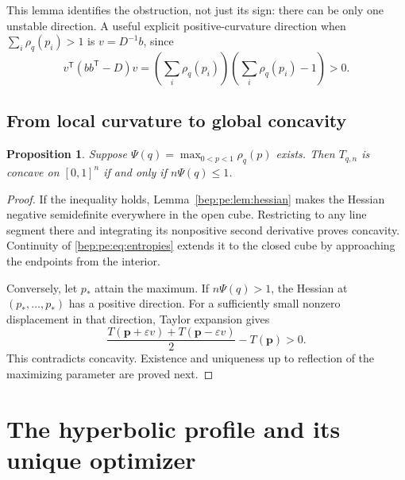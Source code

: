 \documentclass[11pt]{article}
\numberwithin{equation}{section}
\newtheorem{proposition}[theorem]{Proposition}
\theoremstyle{definition}
\theoremstyle{remark}
\newcommand{\p}{\boldsymbol p}
\begin{document}
This lemma identifies the obstruction, not just its sign: there can be
only one unstable direction. A useful explicit positive-curvature
direction when $\sum_i\rho_q(p_i)>1$ is $v=D^{-1}b$, since
\begin{equation}
 v^{\mathsf T}(bb^{\mathsf T}-D)v
 =\left(\sum_i\rho_q(p_i)\right)
  \left(\sum_i\rho_q(p_i)-1\right)>0.
\end{equation}

\subsection{From local curvature to global concavity}
\begin{proposition}\label{bep:pe:prop:criterion}
Suppose $\Psi(q)=\max_{0<p<1}\rho_q(p)$ exists. Then $T_{q,n}$ is
concave on $[0,1]^n$ if and only if $n\Psi(q)\leq1$.
\end{proposition}
\begin{proof}
If the inequality holds, Lemma~\ref{bep:pe:lem:hessian} makes the Hessian
negative semidefinite everywhere in the open cube. Restricting to any
line segment there and integrating its nonpositive second derivative
proves concavity. Continuity of \eqref{bep:pe:eq:entropies} extends it to the
closed cube by approaching the endpoints from the interior.

Conversely, let $p_*$ attain the maximum. If $n\Psi(q)>1$, the
Hessian at $(p_*,\ldots,p_*)$ has a positive direction. For a sufficiently
small nonzero displacement in that direction, Taylor expansion gives
\[
 \frac{T(\p+\varepsilon v)+T(\p-\varepsilon v)}2-T(\p)>0.
\]
This contradicts concavity. Existence and uniqueness up to reflection of
the maximizing parameter are proved next.
\end{proof}

\section{The hyperbolic profile and its unique optimizer}\label{bep:pe:sec:profile}
\end{document}
